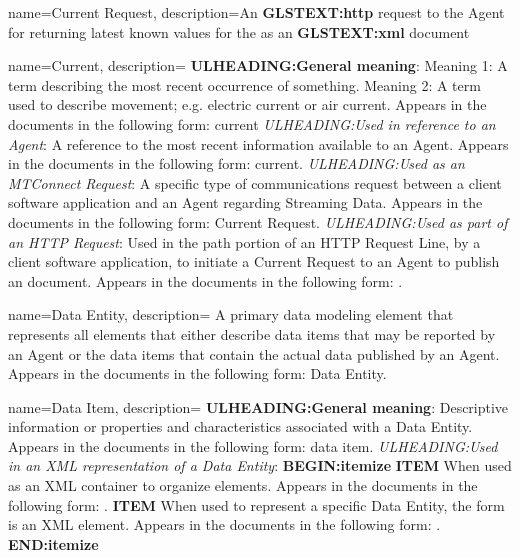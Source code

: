 {
    name={Current Request},
	description={An \textbf{GLSTEXT:http} request to the \gls{Agent} for returning latest known values for the  as an  \textbf{GLSTEXT:xml} document}
}

{
    name={Current},
	description={
	\textbf{ULHEADING:General meaning}:
	Meaning 1:  A term describing the most recent occurrence of something.
	Meaning 2:  A term used to describe movement; e.g. electric current or air current.
	Appears in the documents in the following form: current
	\textit{ULHEADING:Used in reference to an \gls{Agent}}:
	A reference to the most recent information available to an \gls{Agent}.
	Appears in the documents in the following form: current.
	\textit{ULHEADING:Used as an \gls{MTConnect Request}}:
	A specific type of communications request between a client software application and an \gls{Agent} regarding \gls{Streaming Data}.  
	Appears in the documents in the following form: \gls{Current Request}.
	\textit{ULHEADING:Used as part of an \gls{HTTP Request}}:
	Used in the path portion of an \gls{HTTP Request Line}, by a client software application, to initiate a \gls{Current Request} to an \gls{Agent} to publish an  document.
	Appears in the documents in the following form: .
}
}

{
    name={Data Entity},
	description={
	A primary data modeling element that represents all elements that either describe data items that may be reported by an \gls{Agent} or the data items that contain the actual data published by an \gls{Agent}.
	Appears in the documents in the following form: \gls{Data Entity}.
}
}

{
    name={Data Item},
	description={
	\textbf{ULHEADING:General meaning}:
	Descriptive information or properties and characteristics associated with a \gls{Data Entity}.
	Appears in the documents in the following form: data item.
	\textit{ULHEADING:Used in an XML representation of a \gls{Data Entity}}:
    \textbf{BEGIN:itemize}
	\textbf{ITEM} When used as an XML container to organize  elements.
	Appears in the documents in the following form: .
	\textbf{ITEM} When used to represent a specific \gls{Data Entity}, the form  is an XML element.  
	Appears in the documents in the following form: .
    \textbf{END:itemize}
}
}

